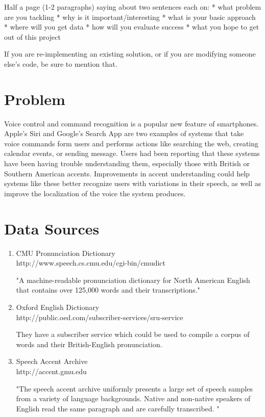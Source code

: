 \documentclass[11pt, letterpaper, oneside]{article}
\begin{document}
Half a page (1-2 paragraphs) saying about two sentences each on:
* what problem are you tackling
* why is it important/interesting
* what is your basic approach
* where will you get data
* how will you evaluate success
* what you hope to get out of this project

If you are re-implementing an existing solution, or if you are modifying someone else's code, be sure to mention that.

\section{Problem}
Voice control and command recognition is a popular new feature of smartphones. 
Apple's Siri and Google's Search App are two examples of systems that take voice commands form users and performs actions like searching the web, creating calendar events, or sending message.
Users had been reporting that these systems have been having trouble understanding them, especially those with British or Southern American accents. 
Improvements in accent understanding could help systems like these better recognize users with variations in their speech, as well as improve the localization of the voice the system produces.


\section{Data Sources}
	\begin{enumerate}
		\item CMU Pronunciation Dictionary \\ http://www.speech.cs.cmu.edu/cgi-bin/cmudict
		
		"A machine-readable pronunciation dictionary for North American English that contains over 125,000 words and their transcriptions."
		\item Oxford English Dictionary \\ http://public.oed.com/subscriber-services/sru-service
		
		They have a subscriber service which could be used to compile a corpus of words and their British-English pronunciation.
		\item Speech Accent Archive \\ http://accent.gmu.edu
		
		"The speech accent archive uniformly presents a large set of speech samples from a variety of language backgrounds. 
		Native and non-native speakers of English read the same paragraph and are carefully transcribed. "
	
	
	\end{enumerate}
\end{document}
